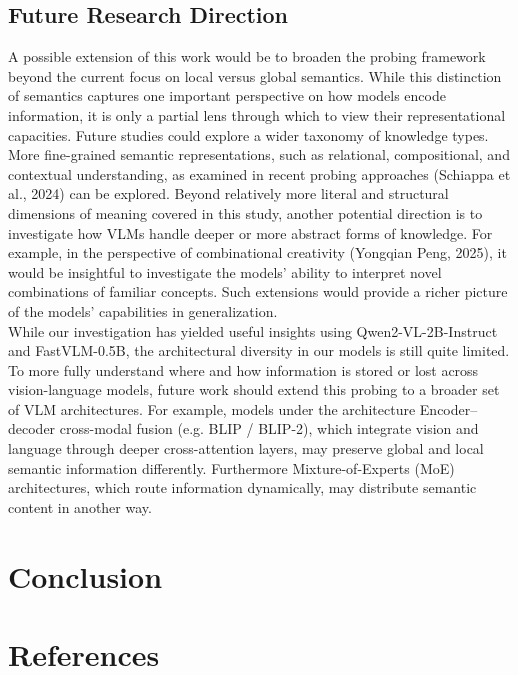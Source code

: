 \documentclass[11pt]{article}
\begin{document}
\subsection{Future Research Direction}
A possible extension of this work would be to broaden the probing framework beyond the current focus on local versus global semantics.
While this distinction of semantics captures one important perspective on how models encode information, it is only a partial lens through which to view their representational capacities.
Future studies could explore a wider taxonomy of knowledge types.
More fine-grained semantic representations, such as relational, compositional, and contextual understanding, as examined in recent probing approaches (Schiappa et al., 2024) can be explored.
Beyond relatively more literal and structural dimensions of meaning covered in this study, another potential direction is to investigate how VLMs handle deeper or more abstract forms of knowledge.
For example, in the perspective of combinational creativity (Yongqian Peng, 2025), it would be insightful to investigate the models' ability to interpret novel combinations of familiar concepts. Such extensions would provide a richer picture of the models’ capabilities in generalization. \\

While our investigation has yielded useful insights using Qwen2-VL-2B-Instruct and FastVLM-0.5B, the architectural diversity in our models is still quite limited.
To more fully understand where and how information is stored or lost across vision-language models, future work should extend this probing to a broader set of VLM architectures.
For example, models under the architecture Encoder–decoder cross-modal fusion (e.g. BLIP / BLIP-2), which integrate vision and language through deeper cross-attention layers, may preserve global and local semantic information differently. Furthermore Mixture-of-Experts (MoE) architectures, which route information dynamically, may distribute semantic content in another way.


\section{Conclusion}

\section{References}


\nocite{*}
\appendix
\end{document}
